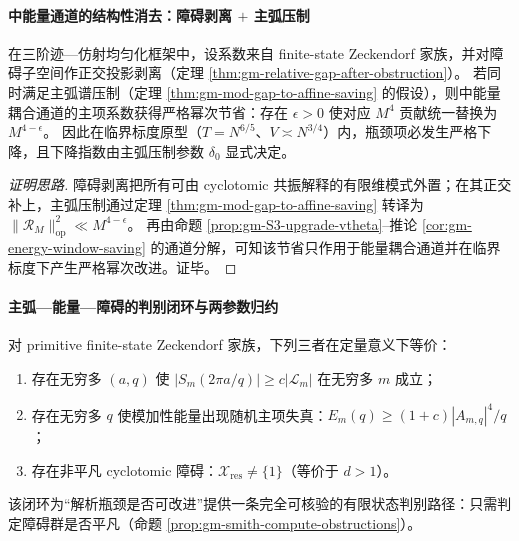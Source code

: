 \paragraph{中能量通道的结构性消去：障碍剥离 \texorpdfstring{$+$}{+} 主弧压制}
\begin{theorem}\label{thm:gm-mid-energy-elimination}
在三阶迹—仿射均匀化框架中，设系数来自 finite-state Zeckendorf 家族，并对障碍子空间作正交投影剥离（定理 \ref{thm:gm-relative-gap-after-obstruction}）。
若同时满足主弧谱压制（定理 \ref{thm:gm-mod-gap-to-affine-saving} 的假设），则中能量耦合通道的主项系数获得严格幂次节省：存在 \(\epsilon>0\) 使对应 \(M^4\) 贡献统一替换为 \(M^{4-\epsilon}\)。
因此在临界标度原型（\(T=N^{6/5}\)、\(V\asymp N^{3/4}\)）内，瓶颈项必发生严格下降，且下降指数由主弧压制参数 \(\delta_0\) 显式决定。
\end{theorem}

\begin{proof}[证明思路]
障碍剥离把所有可由 cyclotomic 共振解释的有限维模式外置；在其正交补上，主弧压制通过定理 \ref{thm:gm-mod-gap-to-affine-saving} 转译为 \(\|\mathcal{R}_M\|_{\mathrm{op}}^2\ll M^{4-\epsilon}\)。
再由命题 \ref{prop:gm-S3-upgrade-vtheta}--推论 \ref{cor:gm-energy-window-saving} 的通道分解，可知该节省只作用于能量耦合通道并在临界标度下产生严格幂次改进。证毕。
\end{proof}

\paragraph{主弧—能量—障碍的判别闭环与两参数归约}
\begin{theorem}\label{thm:gm-majorarc-energy-obstruction-loop}
对 primitive finite-state Zeckendorf 家族，下列三者在定量意义下等价：
\begin{enumerate}
  \item 存在无穷多 \((a,q)\) 使 \(|S_m(2\pi a/q)|\ge c|\mathcal{L}_m|\) 在无穷多 \(m\) 成立；
  \item 存在无穷多 \(q\) 使模加性能量出现随机主项失真：\(E_m(q)\ge (1+c)|A_{m,q}|^4/q\)；
  \item 存在非平凡 cyclotomic 障碍：\(\mathcal{X}_{\mathrm{res}}\neq\{1\}\)（等价于 \(d>1\)）。
\end{enumerate}
该闭环为“解析瓶颈是否可改进”提供一条完全可核验的有限状态判别路径：只需判定障碍群是否平凡（命题 \ref{prop:gm-smith-compute-obstructions}）。
\end{theorem}

